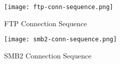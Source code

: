 \begin{figure}[h]
    \centering
    \texttt{[image: ftp-conn-sequence.png]}
    \caption{FTP Connection Sequence}
    \label{fig:ftp-conn-sequence}
\end{figure}

\begin{figure}[h]
    \centering
    \texttt{[image: smb2-conn-sequence.png]}
    \caption{SMB2 Connection Sequence}
    \label{fig:smb2-conn-sequence}
\end{figure}
